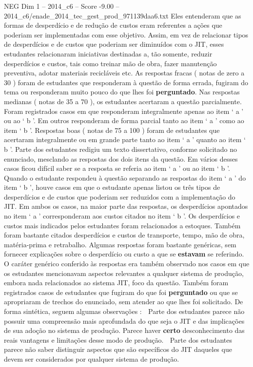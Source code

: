 \begin{textsample}{NEG Dim 1 – 2014\_c6 – Score -9.00 – 2014\_c6/enade\_2014\_tec\_gest\_prod\_971139daa6.txt}
Eles entenderam que as formas de desperdício e de redução de custos eram referentes a ações que poderiam ser implementadas com esse objetivo.
Assim, em vez de relacionar tipos de desperdícios e de custos que poderiam ser diminuídos com o JIT, esses estudantes relacionaram iniciativas destinadas a, tão somente, reduzir desperdícios e custos, tais como treinar mão de obra, fazer manutenção preventiva, adotar materiais recicláveis etc.
As respostas fracas ( notas de zero a 30 ) foram de estudantes que responderam à questão de forma errada, fugiram do tema ou responderam muito pouco do que lhes foi \textbf{perguntado}.
Nas respostas medianas ( notas de 35 a 70 ), os estudantes acertaram a questão parcialmente.
Foram registrados casos em que responderam integralmente apenas ao item ‘ a ’ ou ao ‘ b ’.
Em outros responderam de forma parcial tanto ao item ‘ a ’ como ao item ‘ b ’.
Respostas boas ( notas de 75 a 100 ) foram de estudantes que acertaram integralmente ou em grande parte tanto ao item ‘ a ’ quanto ao item ‘ b ’.
Parte dos estudantes redigiu um texto dissertativo, conforme solicitado no enunciado, mesclando as respostas dos dois itens da questão.
Em vários desses casos ficou difícil saber se a resposta se referia ao item ‘ a ’ ou ao item ‘ b ’.
Quando o estudante respondeu à questão separando as respostas do item ‘ a ’ do item ‘ b ’, houve casos em que o estudante apenas listou os três tipos de desperdícios e de custos que poderiam ser reduzidos com a implementação do JIT.
Em ambos os casos, na maior parte das respostas, os desperdícios apontados no item ‘ a ’ corresponderam aos custos citados no item ‘ b ’.
Os desperdícios e custos mais indicados pelos estudantes foram relacionados a estoques.
Também foram bastante citados desperdícios e custos de transporte, tempo, mão de obra, matéria-prima e retrabalho.
Algumas respostas foram bastante genéricas, sem fornecer explicações sobre o desperdício ou custo a que se \textbf{estavam} se referindo.
O caráter genérico conferido às respostas era também observado nos casos em que os estudantes mencionavam aspectos relevantes a qualquer sistema de produção, embora nada relacionados ao sistema JIT, foco da questão.
Também foram registrados casos de estudantes que fugiram do que foi \textbf{perguntado} ou que se apropriaram de trechos do enunciado, sem atender ao que lhes foi solicitado.
De forma sintética, seguem algumas observações :  Parte dos estudantes parece não possuir uma compreensão mais aprofundada do que seja o JIT e das implicações de sua adoção no sistema de produção.
Parece haver \textbf{certo} desconhecimento das reais vantagens e limitações desse modo de produção.  Parte dos estudantes parece não saber distinguir aspectos que são específicos do JIT daqueles que devem ser considerados por qualquer sistema de produção.

\end{textsample}
